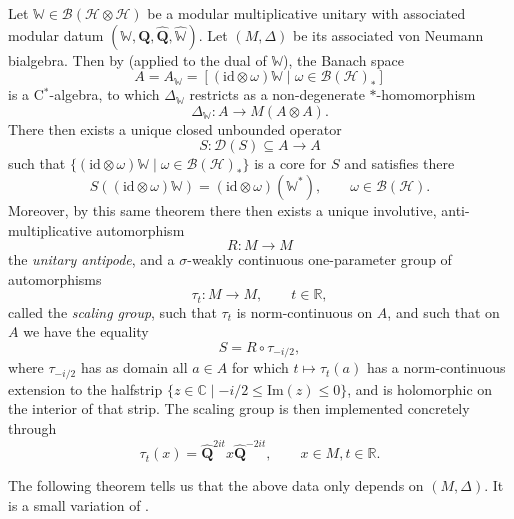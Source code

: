 \documentclass[11pt, reqno]{amsart}
\theoremstyle{definition}
\numberwithin{equation}{section}
\def\C{\mathbb C}
\def\R{\mathbb R}
\newcommand{\Hsp}{\mathcal{H}}
\newcommand{\Bc}{\mathcal{B}}
\newcommand{\Qb}{\mathbf{Q}}
\newcommand{\id}{\mathrm{id}}
\newcommand{\Imm}{\mathrm{Im}}
\newcommand{\Wbb}{\mathbb{W}}
\begin{document}
Let $\Wbb \in \Bc(\Hsp\otimes \Hsp)$ be a modular multiplicative unitary with associated modular datum $(\Wbb,\Qb,\hat{\Qb},\hat{\Wbb})$. Let $(M,\Delta)$ be its associated von Neumann bialgebra. Then by \cite[Theorem 2.3]{SW01} (applied to the dual of $\Wbb$), the Banach space 
\begin{equation}\label{EqCstarMU}
A = A_{\Wbb} =  [(\id\otimes \omega)\Wbb\mid \omega \in \Bc(\Hsp)_*] 
\end{equation}
is a C$^*$-algebra, to which $\Delta_{\Wbb}$ restricts as a non-degenerate $*$-homomorphism
\[
\Delta_{\Wbb}\colon  A \rightarrow M(A\otimes A).
\]
There then exists a unique closed unbounded operator 
\[
S\colon  \mathscr{D}(S) \subseteq A \rightarrow A 
\]
such that $\{(\id\otimes \omega)\Wbb\mid \omega \in \Bc(\Hsp)_*\}$ is a core for $S$ and satisfies there 
\begin{equation}\label{EqModularAntipodeCrit}
S((\id\otimes \omega)\Wbb) = (\id\otimes \omega)(\Wbb^*),\qquad \omega \in \Bc(\Hsp). 
\end{equation}
Moreover, by this same theorem there then exists a unique involutive, anti-multiplicative automorphism
\[
R\colon  M\rightarrow M
\]
the \emph{unitary antipode}, and a $\sigma$-weakly continuous one-parameter group of automorphisms
\begin{equation}\label{EqFormScalGroup}
\tau_t\colon  M \rightarrow M,\qquad t\in \R,
\end{equation}
called the \emph{scaling group}, such that $\tau_t$ is norm-continuous on $A$, and such that on $A$ we have the equality
\[
S = R\circ \tau_{-i/2},
\]
where $\tau_{-i/2}$ has as domain all $a\in A$ for which $t \mapsto \tau_t(a)$ has a norm-continuous extension to the halfstrip $\{z\in \C\mid -i/2\leq \Imm(z) \leq 0\}$, and is holomorphic on the interior of that strip. The scaling group is then implemented concretely through 
\[
\tau_t(x) =  \hat{\Qb}^{2it} x \hat{\Qb}^{-2it},\qquad x\in M,t\in \R.  
\]

The following theorem tells us that the above data only depends on $(M,\Delta)$. It is a small variation of \cite[Theorem 5]{SW07}. 
\end{document}
